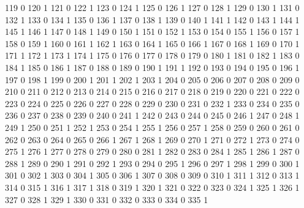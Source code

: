 \documentclass[compress,8pt]{beamer}
\begin{document}
\begin{frame}
\begin{Schunk}
  119     0
  120     1
  121     0
  122     1
  123     0
  124     1
  125     0
  126     1
  127     0
  128     1
  129     0
  130     1
  131     0
  132     1
  133     0
  134     1
  135     0
  136     1
  137     0
  138     1
  139     0
  140     1
  141     1
  142     0
  143     1
  144     1
  145     1
  146     1
  147     0
  148     1
  149     0
  150     1
  151     0
  152     1
  153     0
  154     0
  155     1
  156     0
  157     1
  158     0
  159     1
  160     0
  161     1
  162     1
  163     0
  164     1
  165     0
  166     1
  167     0
  168     1
  169     0
  170     1
  171     1
  172     1
  173     1
  174     1
  175     0
  176     0
  177     0
  178     0
  179     0
  180     1
  181     0
  182     1
  183     0
  184     1
  185     0
  186     1
  187     0
  188     0
  189     0
  190     1
  191     1
  192     0
  193     0
  194     0
  195     0
  196     1
  197     0
  198     1
  199     0
  200     1
  201     1
  202     1
  203     1
  204     0
  205     0
  206     0
  207     0
  208     0
  209     0
  210     0
  211     0
  212     0
  213     0
  214     0
  215     0
  216     0
  217     0
  218     0
  219     0
  220     0
  221     0
  222     0
  223     0
  224     0
  225     0
  226     0
  227     0
  228     0
  229     0
  230     0
  231     0
  232     1
  233     0
  234     0
  235     0
  236     0
  237     0
  238     0
  239     0
  240     0
  241     1
  242     0
  243     0
  244     0
  245     0
  246     1
  247     0
  248     1
  249     1
  250     0
  251     1
  252     1
  253     0
  254     1
  255     1
  256     0
  257     1
  258     0
  259     0
  260     0
  261     0
  262     0
  263     0
  264     0
  265     0
  266     1
  267     1
  268     1
  269     0
  270     1
  271     0
  272     1
  273     0
  274     0
  275     1
  276     1
  277     0
  278     0
  279     0
  280     0
  281     1
  282     0
  283     0
  284     1
  285     1
  286     1
  287     0
  288     1
  289     0
  290     1
  291     0
  292     1
  293     0
  294     0
  295     1
  296     0
  297     1
  298     1
  299     0
  300     1
  301     0
  302     1
  303     0
  304     1
  305     0
  306     1
  307     0
  308     0
  309     0
  310     1
  311     1
  312     0
  313     1
  314     0
  315     1
  316     1
  317     1
  318     0
  319     1
  320     1
  321     0
  322     0
  323     0
  324     1
  325     1
  326     1
  327     0
  328     1
  329     1
  330     0
  331     0
  332     0
  333     0
  334     0
  335     1

\end{Schunk}
\end{frame}
\end{document}
